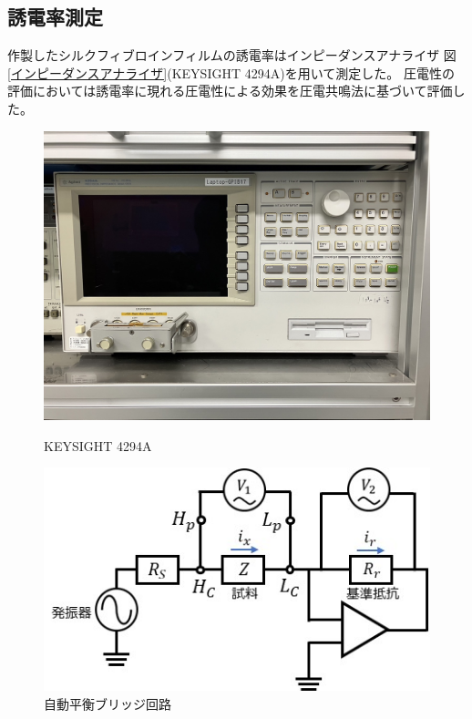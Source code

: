 \documentclass[dvipdfmx,12pt,a4paper]{jreport}
\begin{document}
			\subsection{誘電率測定}
			作製したシルクフィブロインフィルムの誘電率はインピーダンスアナライザ
			図\ref{インピーダンスアナライザ}(KEYSIGHT 4294A)を用いて測定した。
			圧電性の評価においては誘電率に現れる圧電性による効果を圧電共鳴法に基づいて評価した。
			\begin{figure}[h]
				\centering
				\begin{minipage}{0.45\hsize}
					\centering
					\includegraphics[width=\linewidth]{4294A.jpg}
					\caption{KEYSIGHT 4294A}
					\label{インピーダンスアナライザ}
				\end{minipage}
				\begin{minipage}{0.45\hsize}
					\centering
					\includegraphics{自動平衡ブリッジ回路.jpg}
					\caption{自動平衡ブリッジ回路}
					\label{自動平衡ブリッジ回路}
				\end{minipage}
			\end{figure}
\end{document}

